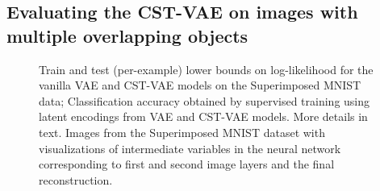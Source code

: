 \vspace{-2mm}
\subsection{Evaluating the CST-VAE on images with multiple overlapping
  objects}
\vspace{-2mm}

\begin{figure}[t]
\begin{center}
\;
\;
\vspace{-4mm}
\end{center}
 \caption{\footnotesize
  Train and test (per-example) lower bounds on log-likelihood 
for the vanilla VAE and CST-VAE models on the Superimposed MNIST data;
 Classification accuracy obtained by supervised training using latent encodings
 from VAE and CST-VAE models.
  More details in text.
   Images from the Superimposed MNIST dataset with visualizations of
 intermediate variables in the neural network corresponding to first and second image layers and the final reconstruction.
}
\end{figure}



